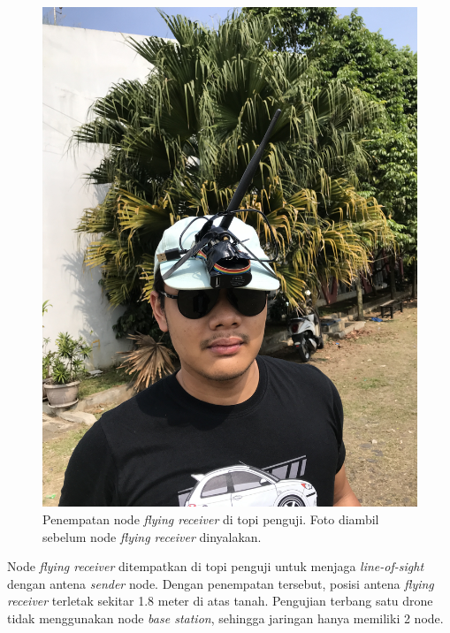 \begin{figure}[H]
	\includegraphics[scale=0.05,angle=270]{./assets/Pengujian/PengujianSatuDrone/PenempatanFlyingReceiver}
	\caption{Penempatan node \textit{flying receiver} di topi penguji. Foto diambil sebelum node \textit{flying receiver} dinyalakan.}
\end{figure}
Node \textit{flying receiver} ditempatkan di topi penguji untuk menjaga \textit{line-of-sight} dengan antena \textit{sender} node. Dengan penempatan tersebut, posisi antena \textit{flying receiver} terletak sekitar 1.8 meter di atas tanah. Pengujian terbang satu drone tidak menggunakan node \textit{base station}, sehingga jaringan hanya memiliki 2 node.

